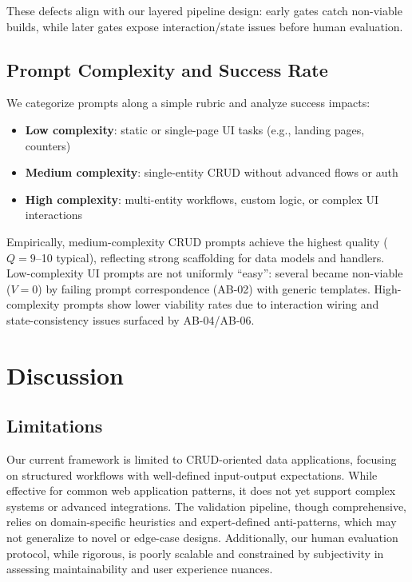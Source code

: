 \documentclass{article}
\begin{document}
These defects align with our layered pipeline design: early gates catch non-viable builds, while later gates expose interaction/state issues before human evaluation.

\subsection{Prompt Complexity and Success Rate}

We categorize prompts along a simple rubric and analyze success impacts:

\begin{itemize}
\item \textbf{Low complexity}: static or single-page UI tasks (e.g., landing pages, counters)
\item \textbf{Medium complexity}: single-entity CRUD without advanced flows or auth
\item \textbf{High complexity}: multi-entity workflows, custom logic, or complex UI interactions
\end{itemize}

Empirically, medium-complexity CRUD prompts achieve the highest quality ($Q=9$--10 typical), reflecting strong scaffolding for data models and handlers. Low-complexity UI prompts are not uniformly ``easy'': several became non-viable ($V=0$) by failing prompt correspondence (AB-02) with generic templates. High-complexity prompts show lower viability rates due to interaction wiring and state-consistency issues surfaced by AB-04/AB-06.

\section{Discussion}

\subsection{Limitations}

Our current framework is limited to CRUD-oriented data applications, focusing on structured workflows with well-defined input-output expectations. While effective for common web application patterns, it does not yet support complex systems or advanced integrations. The validation pipeline, though comprehensive, relies on domain-specific heuristics and expert-defined anti-patterns, which may not generalize to novel or edge-case designs. Additionally, our human evaluation protocol, while rigorous, is poorly scalable and constrained by subjectivity in assessing maintainability and user experience nuances.
\end{document}
